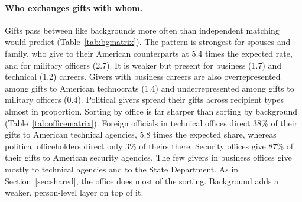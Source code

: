 \documentclass[11pt]{article}
\begin{document}
\paragraph{Who exchanges gifts with whom.} Gifts pass between like backgrounds more often than independent matching would predict (Table~\ref{tab:bgmatrix}). The pattern is strongest for spouses and family, who give to their American counterparts at 5.4 times the expected rate, and for military officers (2.7). It is weaker but present for business (1.7) and technical (1.2) careers. Givers with business careers are also overrepresented among gifts to American technocrats (1.4) and underrepresented among gifts to military officers (0.4). Political givers spread their gifts across recipient types almost in proportion. Sorting by office is far sharper than sorting by background (Table~\ref{tab:officematrix}). Foreign officials in technical offices direct 38\% of their gifts to American technical agencies, 5.8 times the expected share, whereas political officeholders direct only 3\% of theirs there. Security offices give 87\% of their gifts to American security agencies. The few givers in business offices give mostly to technical agencies and to the State Department. As in Section~\ref{sec:shared}, the office does most of the sorting. Background adds a weaker, person-level layer on top of it.

\begin{table}[t]
\centering\scriptsize\setlength{\tabcolsep}{3pt}
\caption{The nature and value of gifts by the background of the giver and of the recipient. Median value and the share over \$5,000 exclude travel. Gift types are coded from the item description by keyword; the remaining 12\% of gifts (pens, desk sets, and miscellany) are not shown.}\label{tab:bggifts}

\end{table}

\begin{table}[t]
\centering\footnotesize
\caption{Log estimated value of a gift regressed on giver and recipient backgrounds and giver office, with branch and year fixed effects. Gifts with both parties linked and a known background, excluding travel. The reference category is political for each set of indicators. Standard errors are clustered by giver. ``Value ratio'' is $\exp(\beta)$, the multiplicative difference in value relative to the reference.}\label{tab:bgvalue}

\end{table}
\end{document}
